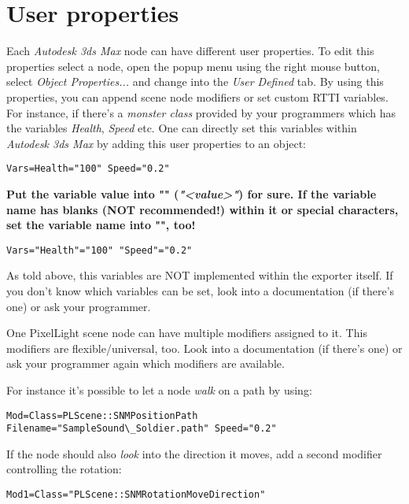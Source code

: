 \chapter{User properties}
Each \emph{Autodesk 3ds Max} node can have different user properties. To edit this properties select a node, open the popup menu using the right mouse button, select \emph{Object Properties...} and change into the \emph{User Defined} tab. By using this properties, you can append scene node modifiers or set custom RTTI variables. For instance, if there's a \emph{monster class} provided by your programmers which has the variables \emph{Health}, \emph{Speed} etc. One can directly set this variables within \emph{Autodesk 3ds Max} by adding this user properties to an object:

\begin{lstlisting}[caption=Setting scene node variables]
Vars=Health="100" Speed="0.2"
\end{lstlisting}

\textbf{Put the variable value into "" (\emph{"<value>"}) for sure. If the variable name has blanks (NOT recommended!) within it or special characters, set the variable name into "", too!}

\begin{lstlisting}[caption=Setting scene node variables safely]
Vars="Health"="100" "Speed"="0.2"
\end{lstlisting}

As told above, this variables are NOT implemented within the exporter itself. If you don't know which variables can be set, look into a documentation (if there's one) or ask your programmer.

One PixelLight scene node can have multiple modifiers assigned to it. This modifiers are flexible/universal, too. Look into a documentation (if there's one) or ask your programmer again which modifiers are available.

For instance it's possible to let a node \emph{walk} on a path by using:

\begin{lstlisting}[caption=Path scene node modifier]
Mod=Class=PLScene::SNMPositionPath Filename="SampleSound\_Soldier.path" Speed="0.2"
\end{lstlisting}

If the node should also \emph{look} into the direction it moves, add a second modifier controlling the rotation:

\begin{lstlisting}[caption=Look into movement direction scene node modifier]
Mod1=Class="PLScene::SNMRotationMoveDirection"
\end{lstlisting}

